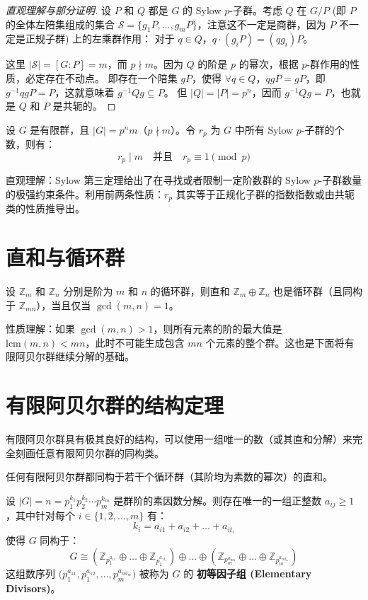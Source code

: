 \documentclass[11pt]{article}
\begin{document}
\begin{proof}[直观理解与部分证明]
设 $P$ 和 $Q$ 都是 $G$ 的 Sylow $p$-子群。考虑 $Q$ 在 $G/P$ (即 $P$ 的全体左陪集组成的集合 $\mathcal{S} = \{ g_1 P, \dots, g_m P \}$，注意这不一定是商群，因为 $P$ 不一定是正规子群) 上的左乘群作用：
对于 $q \in Q$，$q \cdot (g_iP) = (qg_i)P$。

这里 $|\mathcal{S}| = [G:P] = m$，而 $p \nmid m$。因为 $Q$ 的阶是 $p$ 的幂次，根据 $p$-群作用的性质，必定存在不动点。
即存在一个陪集 $gP$，使得 \mbox{$\forall q \in Q$，$qgP = gP$}，即 $g^{-1}qgP = P$，这就意味着 $g^{-1}Qg \subseteq P$。
但 $|Q| = |P| = p^n$，因而 $g^{-1}Qg = P$，也就是 $Q$ 和 $P$ 是共轭的。
\end{proof}

\begin{cntheorem}
设 $G$ 是有限群，且 $|G|=p^n m$（$p \nmid m$）。令 $r_p$ 为 $G$ 中所有 Sylow $p$-子群的个数，则有：
\[ r_p \mid m \quad \text{并且} \quad r_p \equiv 1 \pmod p \]
\end{cntheorem}

直观理解：Sylow 第三定理给出了在寻找或者限制一定阶数群的 Sylow $p$-子群数量的极强约束条件。利用前两条性质：$r_p$ 其实等于正规化子群的指数指数或由共轭类的性质推导出。

\section{直和与循环群}

\begin{cntheorem}[循环群的直和性质]
设 $\mathbb{Z}_m$ 和 $\mathbb{Z}_n$ 分别是阶为 $m$ 和 $n$ 的循环群，则直和 $\mathbb{Z}_m \oplus \mathbb{Z}_n$ 也是循环群（且同构于 $\mathbb{Z}_{mn}$），当且仅当 $\gcd(m,n)=1$。
\end{cntheorem}

性质理解：如果 $\gcd(m,n) > 1$，则所有元素的阶的最大值是 $\text{lcm}(m,n) < mn$，此时不可能生成包含 $mn$ 个元素的整个群。这也是下面将有限阿贝尔群继续分解的基础。

\section{有限阿贝尔群的结构定理}

有限阿贝尔群具有极其良好的结构，可以使用一组唯一的数（或其直和分解）来完全刻画任意有限阿贝尔群的同构类。

\begin{cntheorem}[有限阿贝尔群的基本定理]
任何有限阿贝尔群都同构于若干个循环群（其阶均为素数的幂次）的直和。 

设 $|G| = n = p_1^{k_1} p_2^{k_2} \cdots p_m^{k_m}$ 是群阶的素因数分解。则存在唯一的一组正整数 $a_{ij} \ge 1$，其中针对每个 $i \in \{1,2,\dots,m\}$ 有：
\[ k_i = a_{i1} + a_{i2} + \dots + a_{it_i} \]
使得 $G$ 同构于：
\[ G \cong \left( \mathbb{Z}_{p_1^{a_{11}}} \oplus \dots \oplus \mathbb{Z}_{p_1^{a_{1t_1}}} \right) \oplus \dots \oplus \left( \mathbb{Z}_{p_m^{a_{m1}}} \oplus \dots \oplus \mathbb{Z}_{p_m^{a_{mt_m}}} \right) \]
这组数序列 $\big( p_1^{a_{11}}, p_1^{a_{12}}, \dots, p_m^{a_{mt_m}} \big)$ 被称为 $G$ 的 \textbf{初等因子组 (Elementary Divisors)}。
\end{cntheorem}
\end{document}
